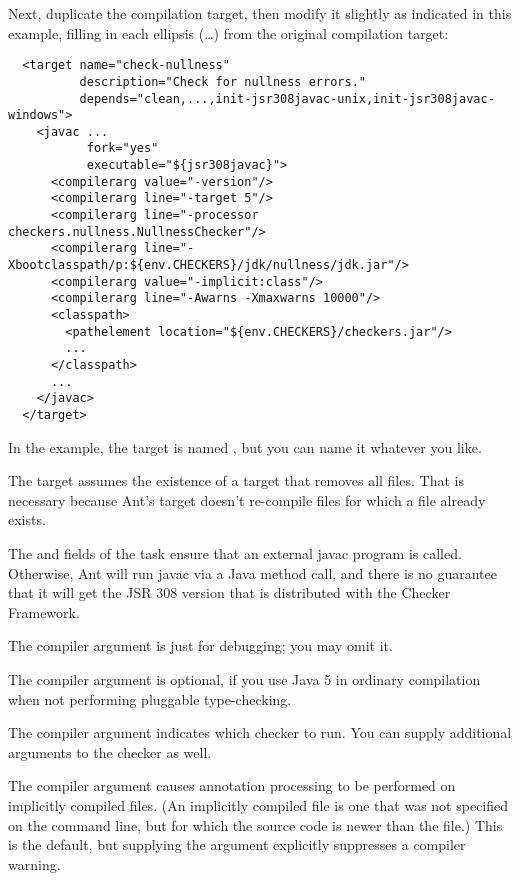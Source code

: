 Next, duplicate the compilation target, then modify it slightly as
indicated in this example, filling in each ellipsis (\ldots) from the
original compilation target:

\begin{smaller}
\begin{Verbatim}
  <target name="check-nullness"
          description="Check for nullness errors."
          depends="clean,...,init-jsr308javac-unix,init-jsr308javac-windows">
    <javac ...
           fork="yes"
           executable="${jsr308javac}">
      <compilerarg value="-version"/>
      <compilerarg line="-target 5"/>
      <compilerarg line="-processor checkers.nullness.NullnessChecker"/>
      <compilerarg line="-Xbootclasspath/p:${env.CHECKERS}/jdk/nullness/jdk.jar"/>
      <compilerarg value="-implicit:class"/>
      <compilerarg line="-Awarns -Xmaxwarns 10000"/>
      <classpath>
        <pathelement location="${env.CHECKERS}/checkers.jar"/>
        ...
      </classpath>
      ...
    </javac>
  </target>
\end{Verbatim}
\end{smaller}

In the example, the target is named , but you can
name it whatever you like.

The target assumes the existence of a  target that removes all
 files.  That is necessary because Ant's  target
doesn't re-compile  files for which a  file
already exists.

The  and  fields of the  task
ensure that an external javac program is called.  Otherwise, Ant will run
javac via a Java method call, and there is no guarantee that it will get
the JSR 308 version that is distributed with the Checker Framework.

The  compiler argument is just for debugging; you may omit
it.

The  compiler argument is optional, if you use Java 5 in
ordinary compilation when not performing pluggable type-checking.

The  compiler argument indicates which checker to
run.  You can supply additional arguments to the checker as well.

The  compiler argument causes annotation processing
to be performed on implicitly compiled files.  (An implicitly compiled file
is one that was not specified on the command line, but for which the source
code is newer than the  file.)  This is the default, but
supplying the argument explicitly suppresses a compiler warning.

